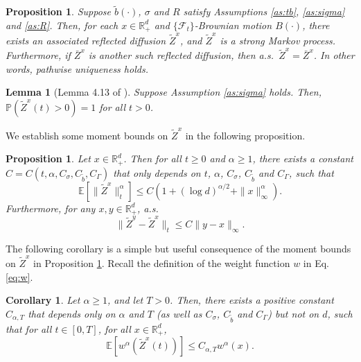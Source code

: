 \documentclass[11pt]{article}
\theoremstyle{definition}
\theoremstyle{plain}
\newtheorem{proposition}[assumption]{Proposition}
\newtheorem{lemma}[assumption]{Lemma}
\newtheorem{corollary}[assumption]{Corollary}
\newcommand{\R}{\mathbb{R}}
\newcommand{\pr}{\mathbb{P}}
\newcommand{\E}{\mathbb{E}}
\newcommand{\tb}{\tilde{b}}
\begin{document}
\begin{proposition}
Suppose $\tb(\cdot)$, $\sigma$ and $R$ satisfy Assumptions \ref{as:tb}, \ref{as:sigma} and \ref{as:R}. 
Then, for each $x \in \mathbb{R}_+^d$ and $\{\mathcal{F}_t\}$-Brownian motion $B(\cdot)$, there exists an associated reflected diffusion $\tilde Z^x$, and $\tilde Z^x$ is a strong Markov process. Furthermore, if $\bar Z^x$ is another such reflected diffusion, then a.s.\ $\tilde Z^x = \bar Z^x$. In other words, pathwise uniqueness holds.
\end{proposition}

\begin{lemma}[Lemma 4.13 of \cite{LipshutzRamanan2019b}]\label{lem:Z>0}
Suppose Assumption \ref{as:sigma} holds. Then, 
$\pr\left(\tilde Z^x(t) > 0\right) = 1$ for all $t > 0$.
\end{lemma}

We establish some moment bounds on $\tilde Z^x$ in the following proposition. 
\begin{proposition}\label{prop:moment-Z}
Let $x \in \mathbb{R}^d_+$. Then for all $t \ge 0$ and $\alpha \geq 1$, there exists a constant $C = C(t, \alpha, C_\sigma, C_{\tb}, C_{\Gamma})$ that only depends on 
$t$, $\alpha$, $C_\sigma$, $C_{\tb}$ and $C_{\Gamma}$, such that
\begin{equation}\label{eq:moment1}
\mathbb{E} \left[ \| \tilde{Z}^x \|_t^\alpha \right] \leq C \left(1 + (\log d)^{\alpha/2} + \|x\|^\alpha_\infty\right).
\end{equation}
Furthermore, for any $x, y\in \R_+^d$, a.s.
\begin{equation}\label{eq:moment2}
\| \tilde{Z}^y - \tilde{Z}^x \|_t \leq C \|y - x\|_\infty.
\end{equation}
\end{proposition}

The following corollary is a simple but useful consequence of the moment bounds on $\tilde Z^x$ in Proposition \ref{prop:moment-Z}. 
Recall the definition of the weight function $w$ in Eq. \eqref{eq:w}.
\begin{corollary}\label{cor:moment-w}
Let $\alpha \geq 1$, and let $T>0$. Then, there exists a positive constant $C_{\alpha,T}$ that depends only on $\alpha$ and $T$ 
(as well as $C_\sigma$, $C_{\tb}$ and $C_{\Gamma}$) but not on $d$, such that 
for all $t \in [0, T]$, for all $x \in \R_+^d$,
\begin{equation}
\E\left[w^\alpha \left(\tilde Z^x(t)\right)\right] \leq C_{\alpha, T} w^{\alpha}(x).
\end{equation}
\end{corollary}
\end{document}
